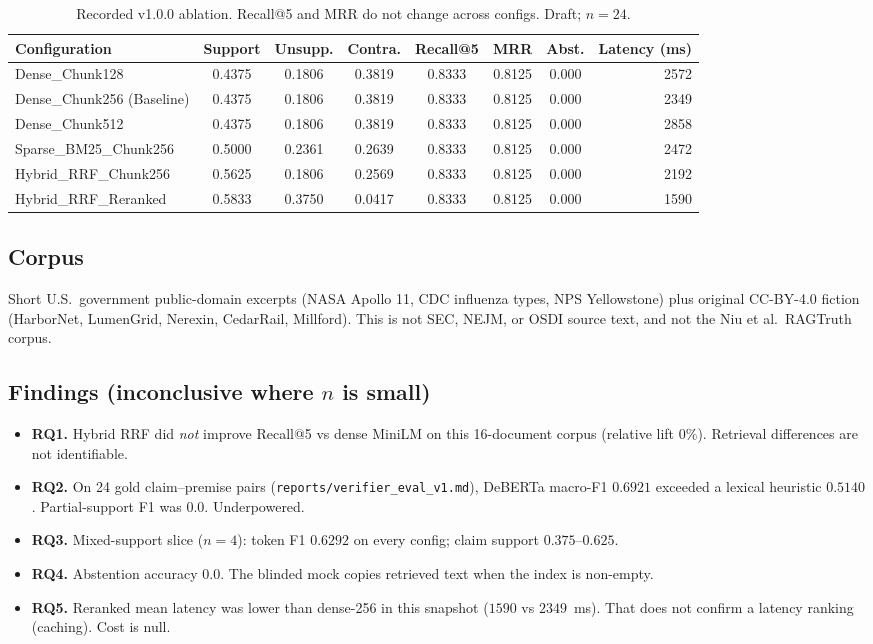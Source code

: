 \documentclass[10pt,twocolumn]{article}
\begin{document}
\begin{table}[t]
\centering
\small
\caption{Recorded v1.0.0 ablation. Recall@5 and MRR do not change across configs. Draft; $n=24$.}
\label{tab:ablation}
\begin{tabular}{lccccccr}
\toprule
\textbf{Configuration} & \textbf{Support} & \textbf{Unsupp.} & \textbf{Contra.} & \textbf{Recall@5} & \textbf{MRR} & \textbf{Abst.} & \textbf{Latency (ms)} \\
\midrule
Dense\_Chunk128 & 0.4375 & 0.1806 & 0.3819 & 0.8333 & 0.8125 & 0.000 & 2572 \\
Dense\_Chunk256 (Baseline) & 0.4375 & 0.1806 & 0.3819 & 0.8333 & 0.8125 & 0.000 & 2349 \\
Dense\_Chunk512 & 0.4375 & 0.1806 & 0.3819 & 0.8333 & 0.8125 & 0.000 & 2858 \\
Sparse\_BM25\_Chunk256 & 0.5000 & 0.2361 & 0.2639 & 0.8333 & 0.8125 & 0.000 & 2472 \\
Hybrid\_RRF\_Chunk256 & 0.5625 & 0.1806 & 0.2569 & 0.8333 & 0.8125 & 0.000 & 2192 \\
Hybrid\_RRF\_Reranked & 0.5833 & 0.3750 & 0.0417 & 0.8333 & 0.8125 & 0.000 & 1590 \\
\bottomrule
\end{tabular}
\end{table}

\subsection{Corpus}
Short U.S.\ government public-domain excerpts (NASA Apollo 11, CDC influenza types, NPS Yellowstone) plus original CC-BY-4.0 fiction (HarborNet, LumenGrid, Nerexin, CedarRail, Millford). This is not SEC, NEJM, or OSDI source text, and not the Niu et al.\ RAGTruth corpus.

\subsection{Findings (inconclusive where $n$ is small)}
\begin{itemize}
    \item \textbf{RQ1.} Hybrid RRF did \emph{not} improve Recall@5 vs dense MiniLM on this 16-document corpus (relative lift $0\%$). Retrieval differences are not identifiable.
    \item \textbf{RQ2.} On 24 gold claim--premise pairs (\texttt{reports/verifier\_eval\_v1.md}), DeBERTa macro-F1 $0.6921$ exceeded a lexical heuristic $0.5140$. Partial-support F1 was $0.0$. Underpowered.
    \item \textbf{RQ3.} Mixed-support slice ($n=4$): token F1 $0.6292$ on every config; claim support $0.375$--$0.625$.
    \item \textbf{RQ4.} Abstention accuracy $0.0$. The blinded mock copies retrieved text when the index is non-empty.
    \item \textbf{RQ5.} Reranked mean latency was lower than dense-256 in this snapshot ($1590$ vs $2349$~ms). That does not confirm a latency ranking (caching). Cost is null.
\end{itemize}
\end{document}
